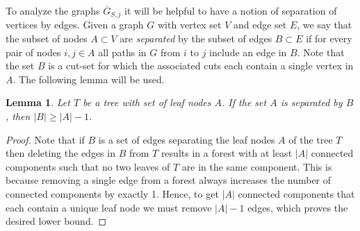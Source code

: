 \documentclass[11pt]{article}
\newtheorem{lemm}[theo]{Lemma}
\theoremstyle{definition}
\numberwithin{equation}{section}
\begin{document}
To analyze the graphs $\overline{G}_{S,j}$ it will be helpful to have a notion of separation of vertices by edges. 
Given a graph $G$ with vertex set $V$ and edge set $E$, we say that the subset of nodes $A\subset V$ are \emph{separated} by the subset of edges $B\subset E$ if for every pair of nodes $i,j\in A$ all paths in $G$ from $i$ to $j$ include an edge in $B$. 
Note that the set $B$ is a cut-set for which the associated cuts each contain a single vertex in $A$. 
The following lemma will be used.
\begin{lemm}
\label{lem: separating tree leaves}
Let $T$ be a tree with set of leaf nodes $A$.  
If the set $A$ is separated by $B$, then $|B| \geq |A|-1$. 
\end{lemm}

\begin{proof}
    Note that if $B$ is a set of edges separating the leaf nodes $A$ of the tree $T$ then deleting the edges in $B$ from $T$ results in a forest with at least $|A|$ connected components such that no two leaves of $T$ are in the same component.  This is because removing a single edge from a forest always increases the number of connected components by exactly 1. Hence, to get $|A|$ connected components that each contain a unique leaf node we must remove $|A| - 1$ edges, which proves the desired lower bound.
\end{proof}
\end{document}
